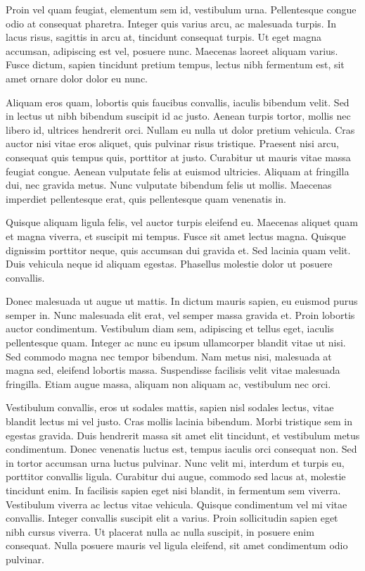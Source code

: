 \documentclass[journal]{IEEEtran}
\begin{document}
Proin vel quam feugiat, elementum sem id, vestibulum urna. Pellentesque congue odio at consequat pharetra. Integer quis varius arcu, ac malesuada turpis. In lacus risus, sagittis in arcu at, tincidunt consequat turpis. Ut eget magna accumsan, adipiscing est vel, posuere nunc. Maecenas laoreet aliquam varius. Fusce dictum, sapien tincidunt pretium tempus, lectus nibh fermentum est, sit amet ornare dolor dolor eu nunc.

Aliquam eros quam, lobortis quis faucibus convallis, iaculis bibendum velit. Sed in lectus ut nibh bibendum suscipit id ac justo. Aenean turpis tortor, mollis nec libero id, ultrices hendrerit orci. Nullam eu nulla ut dolor pretium vehicula. Cras auctor nisi vitae eros aliquet, quis pulvinar risus tristique. Praesent nisi arcu, consequat quis tempus quis, porttitor at justo. Curabitur ut mauris vitae massa feugiat congue. Aenean vulputate felis at euismod ultricies. Aliquam at fringilla dui, nec gravida metus. Nunc vulputate bibendum felis ut mollis. Maecenas imperdiet pellentesque erat, quis pellentesque quam venenatis in.

Quisque aliquam ligula felis, vel auctor turpis eleifend eu. Maecenas aliquet quam et magna viverra, et suscipit mi tempus. Fusce sit amet lectus magna. Quisque dignissim porttitor neque, quis accumsan dui gravida et. Sed lacinia quam velit. Duis vehicula neque id aliquam egestas. Phasellus molestie dolor ut posuere convallis.

Donec malesuada ut augue ut mattis. In dictum mauris sapien, eu euismod purus semper in. Nunc malesuada elit erat, vel semper massa gravida et. Proin lobortis auctor condimentum. Vestibulum diam sem, adipiscing et tellus eget, iaculis pellentesque quam. Integer ac nunc eu ipsum ullamcorper blandit vitae ut nisi. Sed commodo magna nec tempor bibendum. Nam metus nisi, malesuada at magna sed, eleifend lobortis massa. Suspendisse facilisis velit vitae malesuada fringilla. Etiam augue massa, aliquam non aliquam ac, vestibulum nec orci.

Vestibulum convallis, eros ut sodales mattis, sapien nisl sodales lectus, vitae blandit lectus mi vel justo. Cras mollis lacinia bibendum. Morbi tristique sem in egestas gravida. Duis hendrerit massa sit amet elit tincidunt, et vestibulum metus condimentum. Donec venenatis luctus est, tempus iaculis orci consequat non. Sed in tortor accumsan urna luctus pulvinar. Nunc velit mi, interdum et turpis eu, porttitor convallis ligula. Curabitur dui augue, commodo sed lacus at, molestie tincidunt enim. In facilisis sapien eget nisi blandit, in fermentum sem viverra. Vestibulum viverra ac lectus vitae vehicula. Quisque condimentum vel mi vitae convallis. Integer convallis suscipit elit a varius. Proin sollicitudin sapien eget nibh cursus viverra. Ut placerat nulla ac nulla suscipit, in posuere enim consequat. Nulla posuere mauris vel ligula eleifend, sit amet condimentum odio pulvinar.
\end{document}
